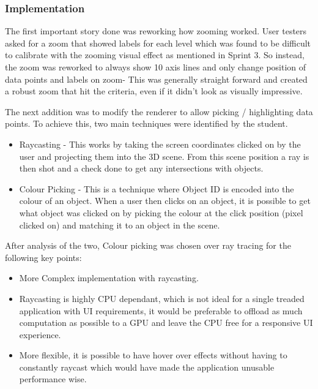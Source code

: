 \subsubsection{Implementation}
The first important story done was reworking how zooming worked. User testers asked for a zoom that showed labels for each level which was found to be difficult to calibrate with the zooming visual effect as mentioned in Sprint 3. So instead, the zoom was reworked to always show 10 axis lines and only change position of data points and labels on zoom- This was generally straight forward and created a robust zoom that hit the criteria, even if it didn't look as visually impressive.

The next addition was to modify the renderer to allow picking / highlighting data points. To achieve this, two main techniques were identified by the student.
\begin{itemize}
    \item Raycasting - This works by taking the screen coordinates clicked on by the user and projecting them into the 3D scene. From this scene position a ray is then shot and a check done to get any intersections with objects.
    \item Colour Picking - This is a technique where Object ID is encoded into the colour of an object. When a user then clicks on an object, it is possible to get what object was clicked on by picking the colour at the click position (pixel clicked on) and matching it to an object in the scene.
\end{itemize}

After analysis of the two, Colour picking was chosen over ray tracing for the following key points:
\begin{itemize}
    \item More Complex implementation with raycasting.
    \item Raycasting is highly CPU dependant, which is not ideal for a single treaded application with UI requirements, it would be preferable to offload as much computation as possible to a GPU and leave the CPU free for a responsive UI experience.
    \item More flexible, it is possible to have hover over effects without having to constantly raycast which would have made the application unusable performance wise.
\end{itemize}


